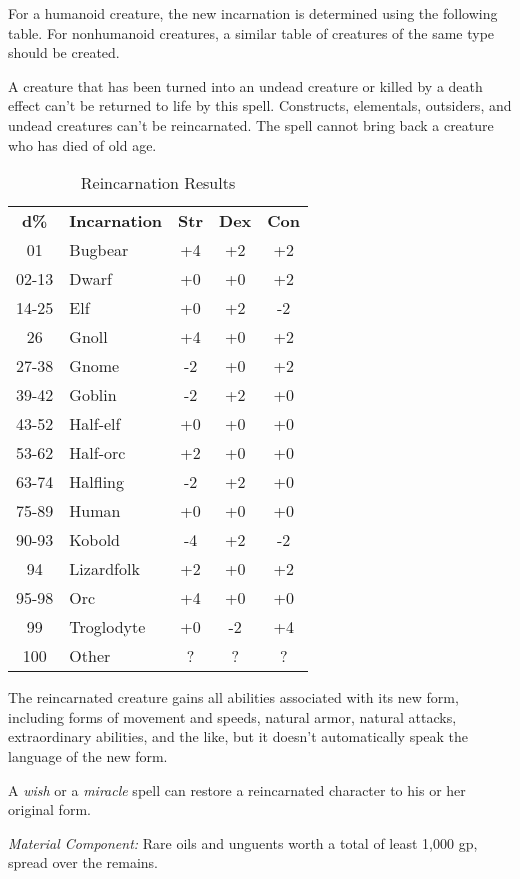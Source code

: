 For a humanoid creature, the new incarnation is determined using the following 
table. For nonhumanoid creatures, a similar table of creatures of the same type 
should be created.

A creature that has been turned into an undead creature or killed by a death effect 
can't be returned to life by this spell.  Constructs, elementals, outsiders, and 
undead creatures can't be reincarnated. The spell cannot bring back a creature 
who has died of old age.

\begin{table}[htb]
\caption{Reincarnation Results}
\centering
\begin{tabular}{c l c c c}
\textbf{d\%} & \textbf{Incarnation} & \textbf{Str} & \textbf{Dex} & \textbf{Con}\\
01 & Bugbear & +4 & +2 & +2\\
02-13 & Dwarf & +0 & +0 & +2\\
14-25 & Elf & +0 & +2 & -2\\
26 & Gnoll & +4 & +0 & +2\\
27-38 & Gnome & -2 & +0 & +2\\
39-42 & Goblin & -2 & +2 & +0\\
43-52 & Half-elf & +0 & +0 & +0\\
53-62 & Half-orc & +2 & +0 & +0\\
63-74 & Halfling & -2 & +2 & +0\\
75-89 & Human & +0 & +0 & +0\\
90-93 & Kobold & -4 & +2 & -2\\
94 & Lizardfolk & +2 & +0 & +2\\
95-98 & Orc & +4 & +0 & +0\\
99 & Troglodyte & +0 & -2 & +4\\
100 & Other & ? & ? & ?\\
\end{tabular}
\end{table}

The reincarnated creature gains all abilities associated with its new form, including 
forms of movement and speeds, natural armor, natural attacks, extraordinary abilities, 
and the like, but it doesn't automatically speak the language of the new form. 

A \textit{wish} or a \textit{miracle} spell can restore a reincarnated character 
to his or her original form.

\textit{Material Component:} Rare oils and unguents worth a total of least 1,000 
gp, spread over the remains.

